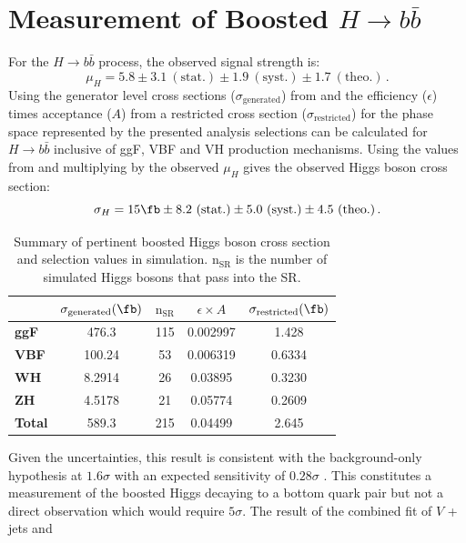 \section{Measurement of Boosted $H \rightarrow b\bar{b}$} \label{sec:results:procedure}

For the $H \rightarrow b\bar{b}$ process, the observed signal strength is:
%
$$ \mu_{H} = 5.8 \pm 3.1~\mathrm{(stat.)} \pm 1.9~\mathrm{(syst.)} \pm
1.7~\mathrm{(theo.)}\,. $$
%
Using the generator level cross sections ($\sigma_\text{generated}$) from
 and the efficiency ($\epsilon$) times acceptance ($A$)
from  a restricted cross section
($\sigma_\text{restricted}$) for the phase space represented by the presented
analysis selections can be calculated for $H \rightarrow b\bar{b}$ inclusive of
ggF, VBF and VH production mechanisms.  Using the values from
 and multiplying by the observed $\mu_{H}$
gives the observed Higgs boson cross section:
%
$$ \sigma_{H} = 15 \fb \pm 8.2 ~\mathrm{(stat.)} \pm 5.0 ~\mathrm{(syst.)} \pm
4.5 ~\mathrm{(theo.)}\,. $$
%
\begin{table}[!t]
  \centering
  \begin{tabular}{l||c|c|c|c}
     & $ \sigma_\text{generated} (\fb)$ & $\text{n}_\text{SR}$ & $\epsilon \times A$ & $\sigma_\text{restricted} (\fb)$ \\
    \hline
    \hline
    \textbf{ggF}   & 476.3  & 115 & 0.002997 & 1.428 \\
    \textbf{VBF}   & 100.24 & 53  & 0.006319 & 0.6334 \\
    \textbf{WH}    & 8.2914 & 26  & 0.03895  & 0.3230 \\
    \textbf{ZH}    & 4.5178 & 21  & 0.05774  & 0.2609 \\
    \hline
    \textbf{Total} & 589.3  & 215 & 0.04499  & 2.645 \\
  \end{tabular} 
  \caption{Summary of pertinent boosted Higgs boson cross section and selection values in simulation. $\text{n}_\text{SR}$ is the number of simulated Higgs bosons that pass into the SR.}
  \label{tab:results:signal_summary}
\end{table}
%
Given the uncertainties, this result is consistent with the background-only
hypothesis at $1.6\sigma$ with an expected sensitivity of $0.28\sigma$
\cite{Feickert:HiggsCouplings2018}.  This constitutes a measurement of the
boosted Higgs decaying to a bottom quark pair but not a direct observation
which would require $5\sigma$. The result of the combined fit of $V$ + jets and
